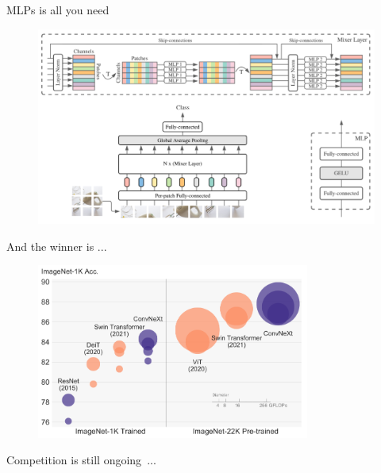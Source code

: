 \documentclass[xcolor=pdftex,dvipsnames,table,mathserif]{beamer}
\begin{document}
\begin{frame}{MLPs is all you need~\cite{tolstikhin_mlp-mixer_2021}}

  \begin{figure}[ht]
    \centering
    \includegraphics[width=\textwidth]{mixer}
  \end{figure}

\end{frame}






\begin{frame}{And the winner is ...}

\pause

\begin{figure}[ht]
  \centering
  \includegraphics[width=0.8\textwidth]{convnext_vs_transformer}
\end{figure}

Competition is still ongoing~\cite{liu_convnet_2022}...


\end{frame}
\end{document}
